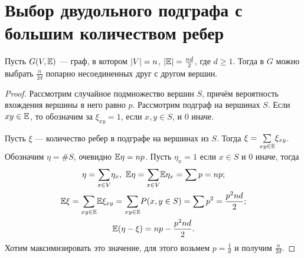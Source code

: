 \section{Выбор двудольного подграфа с большим количеством ребер}

\begin{example} Пусть $G(V, \mathbb{E} )$ --- граф, в котором $\lvert V\rvert = n$,  $\lvert\mathbb{E}\rvert = \frac{nd}{2}$, где $d\ge1$. Тогда в $G$ можно выбрать $\frac{n}{2d}$ попарно несоединенных друг с другом вершин.
\end{example}
    \begin{proof}
        Рассмотрим случайное подмножество вершин $S$, причём вероятность вхождения вершины в него равно $p$. Рассмотрим подграф на вершинах $S$. Если $xy \in \mathbb{E} $, то обозначим за $\xi_{xy} =1$, если $x, y\in S$, и 0 иначе. 
        
       Пусть $\xi$ --- количество ребер в подграфе на вершинах из $S$. Тогда $\xi = \underset{xy\in \mathbb{E} }{\sum}\xi_{xy}$. Обозначим
        $\eta = \#S$, очевидно $\mathbb{E} \eta = np$. Пусть $\eta_x = 1$ если $x\in S$ и 0 иначе, тогда
        \begin{gather*}
            \eta = \underset{x\in V}{\sum}\eta_x, \ \mathbb{E} \eta = \underset{x\in V}{\sum} \mathbb{E} \eta_x = \sum p = np;\\
            \mathbb{E} \xi = \underset{xy\in \mathbb{E} }{\sum} \mathbb{E} \xi_{xy} = \underset{xy\in \mathbb{E} }{\sum} P(x, y \in S) = \sum p^2  = \frac{p^2 nd}{2};\\
            \mathbb{E} (\eta - \xi) = np - \frac{p^2nd}{2}.
        \end{gather*}
        Хотим максимизировать это значение, для этого возьмем $p = \frac{1}{d}$ и получим $\frac{n}{2d}$.
    \end{proof}\newpage
